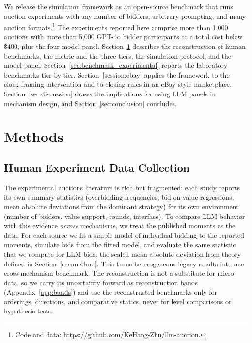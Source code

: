 \documentclass{article} %
\newif\ifmarkrev
\newcommand{\rev}[1]{\ifmarkrev\begingroup\color{red}#1\endgroup\else#1\fi}
\begin{document}
\rev{We release the simulation framework as an open-source benchmark that runs auction experiments with any number of bidders, arbitrary prompting, and many auction formats.\footnote{Code and data: \url{https://github.com/KeHang-Zhu/llm-auction}.}
The experiments reported here comprise more than 1,000 auctions with more than 5,000 GPT-4o bidder participants at a total cost below \$400, plus the four-model panel.
Section~\ref{sec:general_method} describes the reconstruction of human benchmarks, the metric and the three tiers, the simulation protocol, and the model panel.
Section~\ref{sec:benchmark_experimental} reports the laboratory benchmarks tier by tier.
Section~\ref{session:ebay} applies the framework to the clock-framing intervention and to closing rules in an eBay-style marketplace.
Section~\ref{sec:discussion} draws the implications for using LLM panels in mechanism design, and Section~\ref{sec:conclusion} concludes.}



\section{Methods}\label{sec:general_method}
\subsection{Human Experiment Data Collection}

\rev{The experimental auctions literature is rich but fragmented: each study reports its own summary statistics (overbidding frequencies, bid-on-value regressions, mean absolute deviations from the dominant strategy) for its own environment (number of bidders, value support, rounds, interface). To compare LLM behavior with this evidence \emph{across} mechanisms, we treat the published moments as the data. For each source we fit a simple model of individual bidding to the reported moments, simulate bids from the fitted model, and evaluate the same statistic that we compute for LLM bids: the scaled mean absolute deviation from theory defined in Section~\ref{sec:method}. This turns heterogeneous legacy results into one cross-mechanism benchmark. The reconstruction is not a substitute for micro data, so we carry its uncertainty forward as reconstruction bands (Appendix~\ref{app:bands}) and use the reconstructed benchmarks only for orderings, directions, and comparative statics, never for level comparisons or hypothesis tests.}
\end{document}
